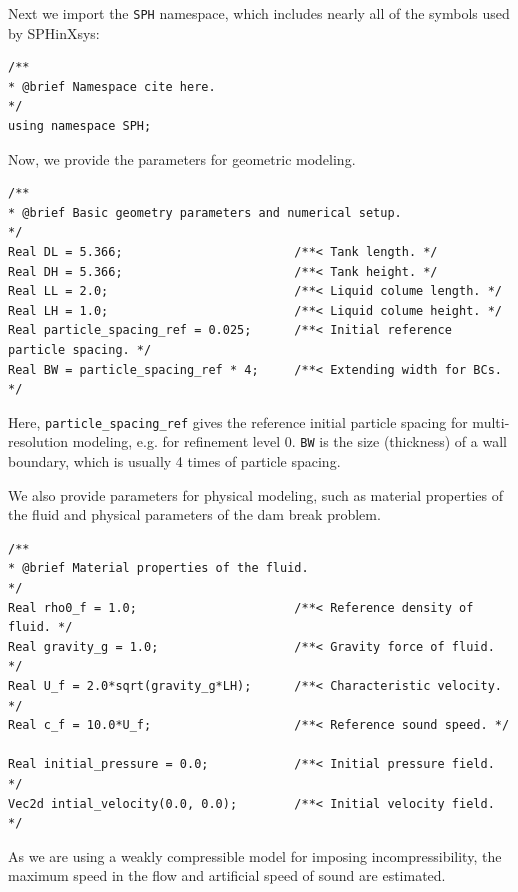 \documentclass[12pt, a4paper,onecolumn]{article}
\begin{document}
Next we import the \texttt{SPH} namespace, 
which includes nearly all of the symbols used by SPHinXsys:
%
\begin{lstlisting}[basicstyle=\ttfamily\footnotesize]
/**
* @brief Namespace cite here.
*/
using namespace SPH;
\end{lstlisting}
%

Now, we provide the parameters for geometric modeling.
%
\begin{lstlisting}[basicstyle=\ttfamily\footnotesize]
/**
* @brief Basic geometry parameters and numerical setup.
*/
Real DL = 5.366; 						/**< Tank length. */
Real DH = 5.366; 						/**< Tank height. */
Real LL = 2.0; 							/**< Liquid colume length. */
Real LH = 1.0; 							/**< Liquid colume height. */
Real particle_spacing_ref = 0.025; 		/**< Initial reference particle spacing. */
Real BW = particle_spacing_ref * 4; 	/**< Extending width for BCs. */
\end{lstlisting}
%
Here, \texttt{particle\_spacing\_ref} gives 
the reference initial particle spacing for multi-resolution modeling, e.g. for refinement level 0. 
\texttt{BW} is the size (thickness) of a wall boundary, which is usually 4 times of particle spacing.

We also provide parameters for physical modeling, 
such as material properties of the fluid and physical parameters of the dam break problem.
%
\begin{lstlisting}[basicstyle=\ttfamily\footnotesize]
/**
* @brief Material properties of the fluid.
*/
Real rho0_f = 1.0;						/**< Reference density of fluid. */
Real gravity_g = 1.0;					/**< Gravity force of fluid. */
Real U_f = 2.0*sqrt(gravity_g*LH);		/**< Characteristic velocity. */
Real c_f = 10.0*U_f;					/**< Reference sound speed. */

Real initial_pressure = 0.0;			/**< Initial pressure field. */
Vec2d intial_velocity(0.0, 0.0);		/**< Initial velocity field. */
\end{lstlisting}
%
As we are using a weakly compressible model for imposing incompressibility, 
the maximum speed in the flow and artificial speed of sound are estimated.
\end{document}
